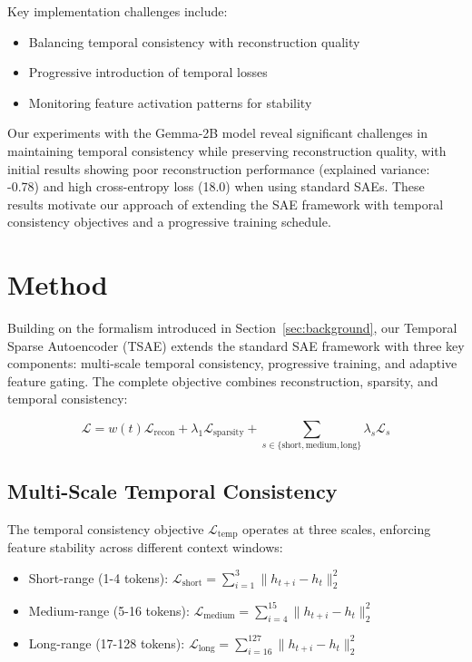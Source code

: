 \documentclass{article} %
\begin{document}
Key implementation challenges include:
\begin{itemize}
    \item Balancing temporal consistency with reconstruction quality
    \item Progressive introduction of temporal losses
    \item Monitoring feature activation patterns for stability
\end{itemize}

Our experiments with the Gemma-2B model reveal significant challenges in maintaining temporal consistency while preserving reconstruction quality, with initial results showing poor reconstruction performance (explained variance: -0.78) and high cross-entropy loss (18.0) when using standard SAEs. These results motivate our approach of extending the SAE framework with temporal consistency objectives and a progressive training schedule.

\section{Method}
\label{sec:method}

Building on the formalism introduced in Section~\ref{sec:background}, our Temporal Sparse Autoencoder (TSAE) extends the standard SAE framework with three key components: multi-scale temporal consistency, progressive training, and adaptive feature gating. The complete objective combines reconstruction, sparsity, and temporal consistency:

\begin{equation}
\mathcal{L} = w(t)\mathcal{L}_{\text{recon}} + \lambda_1\mathcal{L}_{\text{sparsity}} + \sum_{s\in\{\text{short},\text{medium},\text{long}\}} \lambda_s \mathcal{L}_s
\end{equation}

\subsection{Multi-Scale Temporal Consistency}
The temporal consistency objective $\mathcal{L}_{\text{temp}}$ operates at three scales, enforcing feature stability across different context windows:

\begin{itemize}
    \item Short-range (1-4 tokens): $\mathcal{L}_{\text{short}} = \sum_{i=1}^3 \|h_{t+i} - h_t\|_2^2$
    \item Medium-range (5-16 tokens): $\mathcal{L}_{\text{medium}} = \sum_{i=4}^{15} \|h_{t+i} - h_t\|_2^2$
    \item Long-range (17-128 tokens): $\mathcal{L}_{\text{long}} = \sum_{i=16}^{127} \|h_{t+i} - h_t\|_2^2$
\end{itemize}
\end{document}
